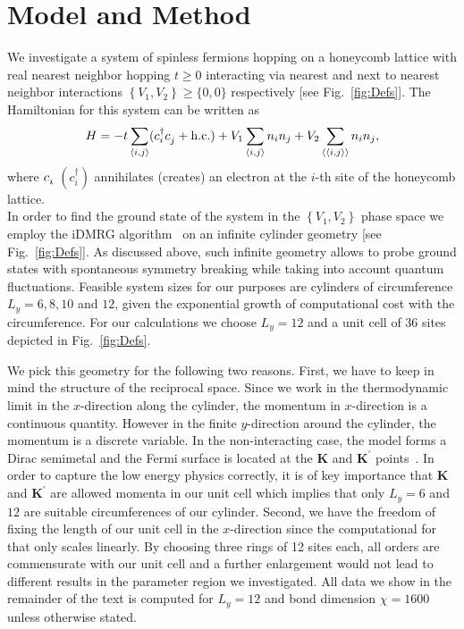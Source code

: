 \documentclass[aps,prx,10pt,twocolumn,floatfix,superscriptaddress,showpacs,numerical,footinbib]{revtex4-1}
\begin{document}
\section{\label{sec:modandmeth}Model and Method}
%
We investigate a system of spinless fermions hopping on a honeycomb lattice with real nearest neighbor hopping $t\ge0$ interacting via nearest and next to nearest neighbor interactions 
$\left\lbrace V_{1},V_{2}\right\rbrace \ge \lbrace 0,0 \rbrace  $ respectively [see Fig.~\ref{fig:Defs}]. 
%
The Hamiltonian for this system can be written as
\begin{equation}
%
 H=-t\sum_{\left\langle i,j\right\rangle}(c^{\dagger}_{i}c^{\vphantom{\dagger}}_{j}+ \mathrm{h.c.})+
V_{1}\sum_{\left\langle i,j\right\rangle }n_{i}n_{j}+
%
V_{2}\sum_{\left\langle \left\langle i,j\right\rangle \right\rangle }n_{i}n_{j},
%
\label{eq:H}
\end{equation}
%
where $c_{i}^{\vphantom{\dagger}}$ $(c^{\dagger}_{i})$  annihilates (creates) an electron at the $i$-th site of the honeycomb lattice.\\
%
In order to find the ground state of the system in the $\left\lbrace V_{1},V_{2}\right\rbrace$ phase space
we employ the iDMRG algorithm~\cite{M08,W92,KZM13} on an infinite cylinder geometry [see Fig.~\ref{fig:Defs}].
%
As discussed above, such infinite geometry allows to probe ground states with spontaneous 
symmetry breaking while taking into account quantum fluctuations.
%
Feasible system sizes for our purposes are cylinders of circumference $L_{y} = 6,8,10$ and $12$, 
given the exponential growth of computational cost with the circumference.
%
For our calculations we choose $L_y=12$ and a unit cell of 36 sites depicted in Fig.~\ref{fig:Defs}.
%

We pick this geometry for the following two reasons.
%
First, we have to keep in mind the structure of the reciprocal space.
%
Since we work in the thermodynamic limit in the $x$-direction along the cylinder, the momentum in $x$-direction is a continuous quantity.
%
However in the finite $y$-direction around the cylinder, the momentum is a discrete variable.
%
In the non-interacting case, the model forms a Dirac semimetal and the Fermi surface is located at the 
$\mathbf{K}$ and $\mathbf{K}^{\prime}$ points~\cite{CastroNeto2009}.
%
In order to capture the low energy physics correctly, it is of key importance that $\mathbf{K}$ and $\mathbf{K}^{\prime}$ are allowed momenta in our unit cell which implies that only $L_y=6$ and $12$ are suitable circumferences of our cylinder.
%
Second, we have the freedom of fixing the length of our unit cell in the $x$-direction since the computational for that only scales linearly.
%
By choosing three rings of 12 sites each, all orders are commensurate with our unit cell and a further enlargement would not lead to different results in the parameter region we investigated.
%
All data we show in the remainder of the text is computed for $L_y = 12$ and bond dimension $\chi = 1600$ unless otherwise stated.
\end{document}
